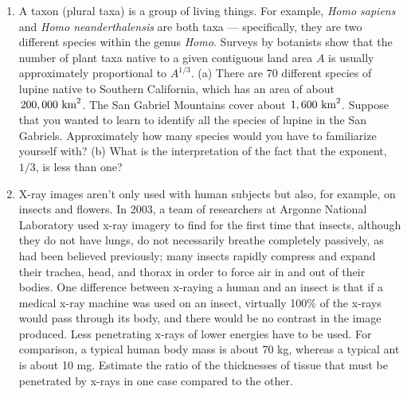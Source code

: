 \begin{enumerate}


\item 
A taxon (plural taxa) is a group of living things. For example, \emph{Homo sapiens} and
\emph{Homo neanderthalensis} are both taxa --- specifically, they are two different species within
the genus \emph{Homo}. Surveys by botanists show that the number of plant taxa native to
a given contiguous land area $A$ is usually approximately proportional to $A^{1/3}$. (a) There are 70
different species of lupine native to Southern California, which has an area of about
$200,000\ \textup{km}^2$. The San Gabriel Mountains cover about $1,600\ \zu{km}^2$. Suppose
that you wanted to learn to identify all the species of lupine in the San Gabriels.
Approximately how many species would you have to familiarize yourself with?
(b) What is the interpretation of the fact that the exponent, $1/3$, is less than one?


\item 
X-ray images aren't only used with human subjects but also, for example,
on insects and flowers. In 2003, a team of researchers at Argonne National Laboratory
used x-ray imagery to find for the first time that insects, although they do not have
lungs, do not necessarily breathe completely passively, as had been believed previously; many insects rapidly compress and
expand their trachea, head, and thorax in order to force air in and out of their bodies.
One difference between x-raying a human and an insect is that if a medical x-ray machine was
used on an insect, virtually 100\% of the x-rays would pass through its body, and there would
be no contrast in the image produced. Less penetrating x-rays of lower energies have to
be used. For comparison, a typical human body mass is about 70 kg, whereas
a typical ant is about 10 mg. Estimate the ratio of the thicknesses of tissue that must be
penetrated by x-rays in one case compared to the other.


\end{enumerate}
